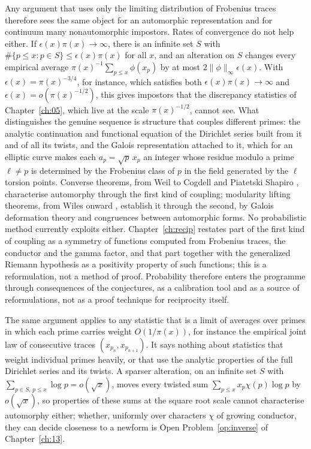 Any argument that uses only the limiting distribution of Frobenius traces therefore sees the same object for an automorphic representation and for continuum many nonautomorphic impostors. Rates of convergence do not help either. If $\epsilon(x)\pi(x)\to\infty$, there is an infinite set $S$ with $\#\{p\le x:p\in S\}\le\epsilon(x)\pi(x)$ for all $x$, and an alteration on $S$ changes every empirical average $\pi(x)^{-1}\sum_{p\le x}\phi(x_p)$ by at most $2\|\phi\|_\infty\epsilon(x)$. With $\epsilon(x)=\pi(x)^{-3/4}$, for instance, which satisfies both $\epsilon(x)\pi(x)\to\infty$ and $\epsilon(x)=o(\pi(x)^{-1/2})$, this gives impostors that the discrepancy statistics of Chapter~\ref{ch:05}, which live at the scale $\pi(x)^{-1/2}$, cannot see. What distinguishes the genuine sequence is structure that couples different primes: the analytic continuation and functional equation of the Dirichlet series built from it and of all its twists, and the Galois representation attached to it, which for an elliptic curve makes each $a_p=\sqrt p\,x_p$ an integer whose residue modulo a prime $\ell\ne p$ is determined by the Frobenius class of $p$ in the field generated by the $\ell$ torsion points. Converse theorems, from Weil \cite{weil1967} to Cogdell and Piatetski Shapiro \cite{cogdellps1994}, characterise automorphy through the first kind of coupling; modularity lifting theorems, from Wiles onward \cite{wiles1995,taylorwiles1995}, establish it through the second, by Galois deformation theory and congruences between automorphic forms. No probabilistic method currently exploits either. Chapter~\ref{ch:recip} restates part of the first kind of coupling as a symmetry of functions computed from Frobenius traces, the conductor and the gamma factor, and that part together with the generalized Riemann hypothesis as a positivity property of such functions; this is a reformulation, not a method of proof. Probability therefore enters the programme through consequences of the conjectures, as a calibration tool and as a source of reformulations, not as a proof technique for reciprocity itself.

\begin{remark}
The same argument applies to any statistic that is a limit of averages over primes in which each prime carries weight $O(1/\pi(x))$, for instance the empirical joint law of consecutive traces $(x_{p_n},x_{p_{n+1}})$. It says nothing about statistics that weight individual primes heavily, or that use the analytic properties of the full Dirichlet series and its twists. A sparser alteration, on an infinite set $S$ with $\sum_{p\in S,\,p\le x}\log p=o(\sqrt x)$, moves every twisted sum $\sum_{p\le x}x_p\chi(p)\log p$ by $o(\sqrt x)$, so properties of these sums at the square root scale cannot characterise automorphy either; whether, uniformly over characters $\chi$ of growing conductor, they can decide closeness to a newform is Open Problem~\ref{op:inverse} of Chapter~\ref{ch:13}.
\end{remark}

